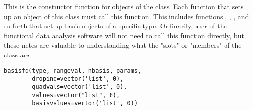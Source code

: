 \documentclass{article}
\begin{document}
\aliasA{[.basisfd}{basisfd}{[.basisfd}
\begin{Description}\relax
This is the constructor function for objects of the 
class.  Each function that sets up an object of this class must call
this function.  This includes functions ,
, , and so
forth that set up basis objects of a specific type.  Ordinarily, user
of the functional data analysis software will not need to call this
function directly, but these notes are valuable to understanding what
the "slots" or "members" of the  class are.
\end{Description}
\begin{Usage}
\begin{verbatim}
basisfd(type, rangeval, nbasis, params,
        dropind=vector('list', 0),
        quadvals=vector('list', 0),
        values=vector("list", 0),
        basisvalues=vector('list', 0))
\end{verbatim}
\end{Usage}
\end{document}
